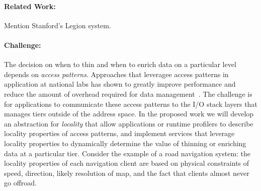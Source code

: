 \paragraph{Related Work:} Mention Stanford's Legion system.

\paragraph{Challenge:} The decision on when to thin and when to
enrich data on a particular level depends on \emph{access patterns}.
Approaches that leveragee access patterns in application at national
labs has shown to greatly improve performance and reduce the amount
of overhead required for data management~\cite{he:hpdc13}. The
challenge is for applications to communicate these access patterns
to the I/O stack layers that manages tiers outside of the address
space. In the proposed work we will develop an abstraction for
\emph{locality} that allow applications or runtime profilers to
describe locality properties of access patterns, and implement
services that leverage locality properties to dynamically determine
the value of thinning or enriching data at a particular tier.
Consider the example of a road navigation system: the locality
properties of each navigation client are based on physical constraints
of speed, direction, likely resolution of map, and the fact that
clients almost never go offroad.
